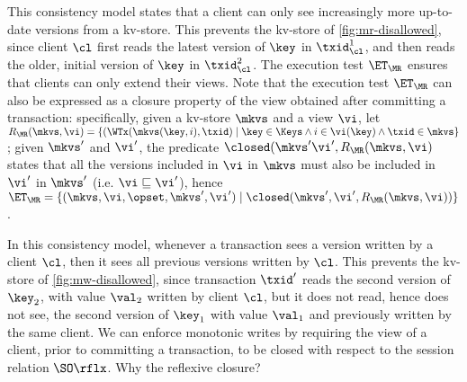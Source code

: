 
This consistency model states that a client
can only see increasingly more up-to-date versions from a kv-store. 
This prevents \eg the kv-store of \cref{fig:mr-disallowed},
since client $\cl$ first reads the latest version of $\key$ in $\txid_{\cl}^{1}$, 
and then reads the older, initial version of $\key$ in $\txid_{\cl}^{2}$.  
The execution test $\ET_{\MR}$ ensures that clients  can only extend their views. 
Note that the execution test $\ET_{\MR}$ can also be expressed as a closure 
property of the view obtained after committing a transaction: 
specifically, given a kv-store $\mkvs$ and a view $\vi$, let 
$R_{\MR}(\mkvs, \vi) = \{(\WTx(\mkvs(\key, i), \txid) \mid \key \in \Keys \wedge i \in \vi(\key) 
\wedge \txid \in \mkvs\}$; given $\mkvs'$ and $\vi'$, 
the predicate $\closed(\mkvs' \vi', R_{\MR}(\mkvs, \vi)$ states that all the versions included in $\vi$ in $\mkvs$ 
must also be included in $\vi'$ in $\mkvs'$ (i.e. $\vi \sqsubseteq \vi'$), hence 
$\ET_{\MR} = \{(\mkvs, \vi, \opset, \mkvs', \vi') \mid \closed(\mkvs', \vi', 
R_{\MR}(\mkvs, \vi))\}$.

In this consistency model, whenever a transaction sees a version written by a client $\cl$,
then it sees all previous versions written by $\cl$. 
This prevents \eg the kv-store of \cref{fig:mw-disallowed}, since 
transaction $\txid'$ reads the second version of $\key_2$, 
with value $\val_2$ written by client $\cl$, 
but it does not read, hence does not see, the second version of $\key_1$
with value $\val_1$ and previously written by the same client. 
We can enforce monotonic writes by requiring the view of a client, prior to committing 
a transaction, to be closed with respect to the session relation $\SO\rflx$.
\ac{Why the reflexive closure?}

